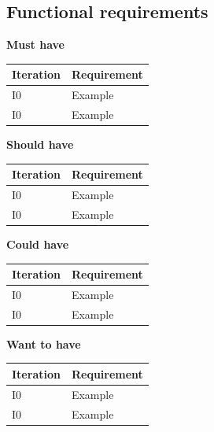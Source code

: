 \subsection{Functional requirements}
\textbf{Must have}
\begin{table}[H]
\begin{tabular}{|l|l|}
\hline
Iteration & Requirement \\ \hline
I0        & Example     \\ \hline
I0        & Example     \\ \hline
\end{tabular}
\end{table}
\noindent
\textbf{Should have}
\begin{table}[H]
\begin{tabular}{|l|l|}
\hline
Iteration & Requirement \\ \hline
I0        & Example     \\ \hline
I0        & Example     \\ \hline
\end{tabular}
\end{table}
\noindent
\textbf{Could have}
\begin{table}[H]
\begin{tabular}{|l|l|}
\hline
Iteration & Requirement \\ \hline
I0        & Example     \\ \hline
I0        & Example     \\ \hline
\end{tabular}
\end{table}
\noindent
\textbf{Want to have}
\begin{table}[H]
\begin{tabular}{|l|l|}
\hline
Iteration & Requirement \\ \hline
I0        & Example     \\ \hline
I0        & Example     \\ \hline
\end{tabular}
\end{table}
\noindent

